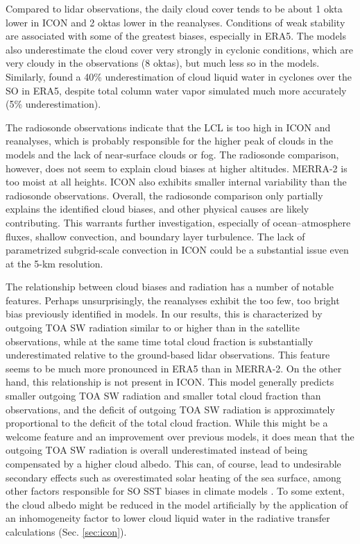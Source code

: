 \documentclass[draft]{agujournal2019}
\begin{document}
Compared to lidar observations, the daily cloud cover tends to be about 1 okta lower in ICON and 2 oktas lower in the reanalyses. Conditions of weak stability are associated with some of the greatest biases, especially in ERA5. The models also underestimate the cloud cover very strongly in cyclonic conditions, which are very cloudy in the observations (8 oktas), but much less so in the models. Similarly,  found a 40\% underestimation of cloud liquid water in cyclones over the SO in ERA5, despite total column water vapor simulated much more accurately (5\% underestimation).

The radiosonde observations indicate that the LCL is too high in ICON and reanalyses, which is probably responsible for the higher peak of clouds in the models and the lack of near-surface clouds or fog. The radiosonde comparison, however, does not seem to explain cloud biases at higher altitudes. MERRA-2 is too moist at all heights. ICON also exhibits smaller internal variability than the radiosonde observations. Overall, the radiosonde comparison only partially explains the identified cloud biases, and other physical causes are likely contributing. This warrants further investigation, especially of ocean--atmosphere fluxes, shallow convection, and boundary layer turbulence. The lack of parametrized subgrid-scale convection in ICON could be a substantial issue even at the 5-km resolution.

The relationship between cloud biases and radiation has a number of notable features. Perhaps unsurprisingly, the reanalyses exhibit the too few, too bright bias previously identified in models. In our results, this is characterized by outgoing TOA SW radiation similar to or higher than in the satellite observations, while at the same time total cloud fraction is substantially underestimated relative to the ground-based lidar observations. This feature seems to be much more pronounced in ERA5 than in MERRA-2. On the other hand, this relationship is not present in ICON. This model generally predicts smaller outgoing TOA SW radiation and smaller total cloud fraction than observations, and the deficit of outgoing TOA SW radiation is approximately proportional to the deficit of the total cloud fraction. While this might be a welcome feature and an improvement over previous models, it does mean that the outgoing TOA SW radiation is overall underestimated instead of being compensated by a higher cloud albedo. This can, of course, lead to undesirable secondary effects such as overestimated solar heating of the sea surface, among other factors responsible for SO SST biases in climate models \cite{zhang2023,luo2023,hyder2018}. To some extent, the cloud albedo might be reduced in the model artificially by the application of an inhomogeneity factor to lower cloud liquid water in the radiative transfer calculations (Sec. \ref{sec:icon}).
\end{document}
